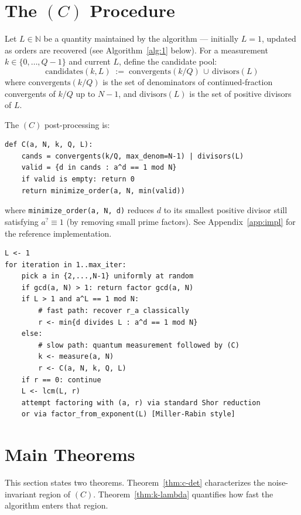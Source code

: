 \documentclass[11pt]{article}
\begin{document}
\section{The $(C)$ Procedure}
\label{sec:procedure}

Let $L \in \mathbb{N}$ be a quantity maintained by the algorithm --- initially $L = 1$, updated as orders are recovered (see Algorithm~\ref{alg:1} below). For a measurement $k \in \{0, \ldots, Q-1\}$ and current $L$, define the candidate pool:
\[
  \mathrm{candidates}(k, L) \;:=\; \mathrm{convergents}(k/Q) \,\cup\, \mathrm{divisors}(L)
\]
where $\mathrm{convergents}(k/Q)$ is the set of denominators of continued-fraction convergents of $k/Q$ up to $N-1$, and $\mathrm{divisors}(L)$ is the set of positive divisors of $L$.

The $(C)$ post-processing is:

\begin{lstlisting}[style=pythonstyle]
def C(a, N, k, Q, L):
    cands = convergents(k/Q, max_denom=N-1) | divisors(L)
    valid = {d in cands : a^d == 1 mod N}
    if valid is empty: return 0
    return minimize_order(a, N, min(valid))
\end{lstlisting}

\noindent
where \texttt{minimize\_order(a, N, d)} reduces $d$ to its smallest positive divisor still satisfying $a^? \equiv 1$ (by removing small prime factors). See Appendix~\ref{app:impl} for the reference implementation.

\begin{lstlisting}[style=pseudostyle, caption={Multi-base accumulation.}, label={alg:1}]
L <- 1
for iteration in 1..max_iter:
    pick a in {2,...,N-1} uniformly at random
    if gcd(a, N) > 1: return factor gcd(a, N)
    if L > 1 and a^L == 1 mod N:
        # fast path: recover r_a classically
        r <- min{d divides L : a^d == 1 mod N}
    else:
        # slow path: quantum measurement followed by (C)
        k <- measure(a, N)
        r <- C(a, N, k, Q, L)
    if r == 0: continue
    L <- lcm(L, r)
    attempt factoring with (a, r) via standard Shor reduction
    or via factor_from_exponent(L) [Miller-Rabin style]
\end{lstlisting}

\section{Main Theorems}
\label{sec:theorem}

This section states two theorems. Theorem~\ref{thm:c-det} characterizes the noise-invariant region of $(C)$. Theorem~\ref{thm:k-lambda} quantifies how fast the algorithm enters that region.
\end{document}
